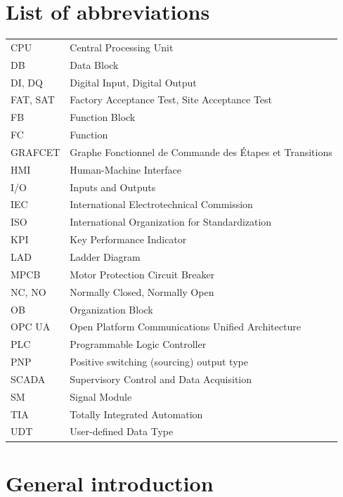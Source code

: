 \documentclass[11pt,a4paper]{report}
\renewcommand{\headrulewidth}{0pt}%
\begin{document}
\chapter*{List of abbreviations}
\begin{tabular}{@{}p{3cm}p{11.5cm}@{}}
CPU & Central Processing Unit\\
DB & Data Block\\
DI, DQ & Digital Input, Digital Output\\
FAT, SAT & Factory Acceptance Test, Site Acceptance Test\\
FB & Function Block\\
FC & Function\\
GRAFCET & Graphe Fonctionnel de Commande des Étapes et Transitions\\
HMI & Human-Machine Interface\\
I/O & Inputs and Outputs\\
IEC & International Electrotechnical Commission\\
ISO & International Organization for Standardization\\
KPI & Key Performance Indicator\\
LAD & Ladder Diagram\\
MPCB & Motor Protection Circuit Breaker\\
NC, NO & Normally Closed, Normally Open\\
OB & Organization Block\\
OPC UA & Open Platform Communications Unified Architecture\\
PLC & Programmable Logic Controller\\
PNP & Positive switching (sourcing) output type\\
SCADA & Supervisory Control and Data Acquisition\\
SM & Signal Module\\
TIA & Totally Integrated Automation\\
UDT & User-defined Data Type\\
\end{tabular}

\clearpage
{}
\pagestyle{fancy}
\fancyhf{}
\fancyhead[L]{\small\leftmark}
\fancyhead[R]{\small\thepage}
\renewcommand{\headrulewidth}{0.4pt}
\renewcommand{\chaptermark}[1]{\markboth{Chapter \thechapter.\ #1}{}}

\chapter*{General introduction}
\end{document}
